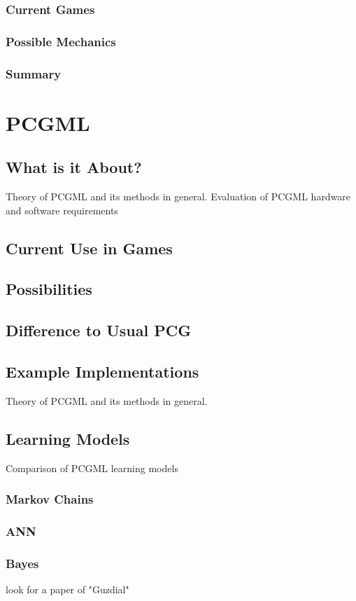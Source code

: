 \documentclass[MGS,Master,english]{twbook}%
\begin{document}
\subsection{Current Games}
\subsection{Possible Mechanics}
\subsection{Summary}


%
%
\clearpage
\chapter{\acl{PCGML}}
\section{What is it About?}
Theory of PCGML and its methods in general.
Evaluation of PCGML hardware and software requirements
\section{Current Use in Games}
\section{Possibilities}
\section{Difference to Usual \acl{PCG}}
\section{Example Implementations}
Theory of PCGML and its methods in general.
\section{Learning Models}
Comparison of PCGML learning models
\subsection{Markov Chains}
\subsection{\acl{ANN}}
\subsection{Bayes}
look for a paper of "Guzdial"
\end{document}
